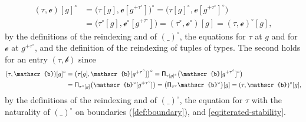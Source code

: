 \begin{definition}
\begin{enumerate}
\begin{align*}
            (\tau, \mathscr{e})[g]^{\circ} &= \big(\tau[g], \mathscr{e}[g^{+\tau^{\circ}}]\big)^{\circ} = \big(\tau[g]^{\circ}, \mathscr{e}[g^{+\tau^{\circ}}]^{\circ}\big)\\
            &= \big(\tau^{\circ}[g], \mathscr{e}^{\circ}[g^{+\tau^{\circ}}]\big) = (\tau^{\circ}, \mathscr{e}^{\circ})[g] = (\tau, \mathscr{e})^{\circ}[g],
        \end{align*}
        by the definitions of the reindexing and of $(\_)^{\circ}$, the equations for $\tau$ at $g$ and for $\mathscr{e}$ at $g^{+\tau^{\circ}}$, and the definition of the reindexing of tuples of types. The second holds for an entry $(\tau, \mathscr{b})$ since
        \begin{align*}
            (\tau, \mathscr{b})[g]^{\circ} &= \big(\tau[g], \mathscr{b}[g^{+\tau^{\circ}}]\big)^{\circ} = \PiT_{\tau[g]^{\circ}}\big(\mathscr{b}[g^{+\tau^{\circ}}]^{\circ}\big)\\
            &= \PiT_{\tau^{\circ}[g]}\big(\mathscr{b}^{\circ}[g^{+\tau^{\circ}}]\big) = \big(\PiT_{\tau^{\circ}}\mathscr{b}^{\circ}\big)[g] = (\tau, \mathscr{b})^{\circ}[g],
        \end{align*}
        by the definitions of the reindexing and of $(\_)^{\circ}$, the equation for $\tau$ with the naturality of $(\_)^{\circ}$ on boundaries (\cref{def:boundary}), and \eqref{eq:iterated-stability}.
    \end{enumerate}
\end{definition}

